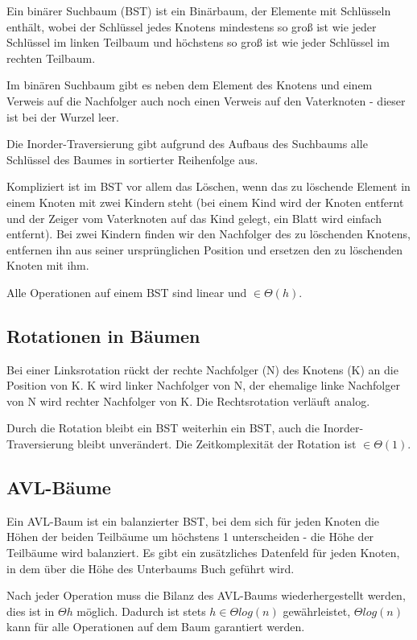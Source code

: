 \documentclass[12pt]{article}
\begin{document}
Ein binärer Suchbaum (BST) ist ein Binärbaum, der Elemente mit Schlüsseln enthält, wobei der Schlüssel jedes Knotens mindestens so groß ist wie jeder Schlüssel im linken Teilbaum und höchstens so groß ist wie jeder Schlüssel im rechten Teilbaum.

Im binären Suchbaum gibt es neben dem Element des Knotens und einem Verweis auf die Nachfolger auch noch einen Verweis auf den Vaterknoten - dieser ist bei der Wurzel leer.

Die Inorder-Traversierung gibt aufgrund des Aufbaus des Suchbaums alle Schlüssel des Baumes in sortierter Reihenfolge aus.

Kompliziert ist im BST vor allem das Löschen, wenn das zu löschende Element in einem Knoten mit zwei Kindern steht (bei einem Kind wird der Knoten entfernt und der Zeiger vom Vaterknoten auf das Kind gelegt, ein Blatt wird einfach entfernt). Bei zwei Kindern finden wir den Nachfolger des zu löschenden Knotens, entfernen ihn aus seiner ursprünglichen Position und ersetzen den zu löschenden Knoten mit ihm.

Alle Operationen auf einem BST sind linear und $\in \Theta(h)$.

\subsection{Rotationen in Bäumen}

Bei einer Linksrotation rückt der rechte Nachfolger (N) des Knotens (K) an die Position von K. K wird linker Nachfolger von N, der ehemalige linke Nachfolger von N wird rechter Nachfolger von K. Die Rechtsrotation verläuft analog.

Durch die Rotation bleibt ein BST weiterhin ein BST, auch die Inorder-Traversierung bleibt unverändert. Die Zeitkomplexität der Rotation ist $\in \Theta(1)$.

\subsection{AVL-Bäume}

Ein AVL-Baum ist ein balanzierter BST, bei dem sich für jeden Knoten die Höhen der beiden Teilbäume um höchstens 1 unterscheiden - die Höhe der Teilbäume wird balanziert. Es gibt ein zusätzliches Datenfeld für jeden Knoten, in dem über die Höhe des Unterbaums Buch geführt wird.

Nach jeder Operation muss die Bilanz des AVL-Baums wiederhergestellt werden, dies ist in $\Theta{h}$ möglich. Dadurch ist stets $h \in \Theta{log(n)}$ gewährleistet, $\Theta{log(n)}$ kann für alle Operationen auf dem Baum garantiert werden.
\end{document}
